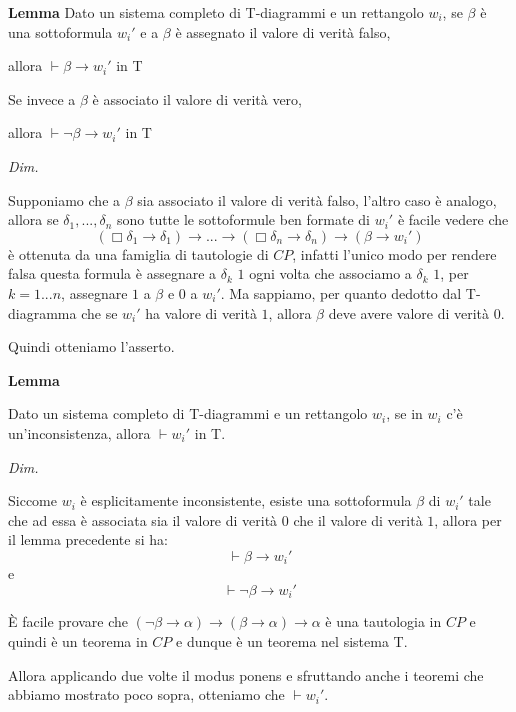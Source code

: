 \documentclass[a4paper, titlepage, 12pt]{report}
\begin{document}
\begin{flushleft}
\textbf{Lemma}
Dato un sistema completo di T-diagrammi e un rettangolo $w_i$,
se $\beta$ è una sottoformula $w_i'$ e a $\beta$ è assegnato il valore di verità falso,

allora $\vdash \beta \rightarrow w_i'$ in T

Se invece a $\beta$ è associato il valore di verità vero,


allora $\vdash \neg \beta \rightarrow w_i'$ in T

\textit{Dim.}

Supponiamo che a $\beta$ sia associato il valore di verità falso, l'altro caso è analogo,
allora se $\delta_1, ..., \delta_n$ sono tutte le sottoformule ben formate di $w_i'$ è
facile vedere che
$$(\Box \delta_1 \rightarrow \delta_1) \rightarrow ... \rightarrow (\Box \delta_n \rightarrow \delta_n) \rightarrow (\beta \rightarrow w_i')$$
è ottenuta da una famiglia di tautologie di $CP$, infatti l'unico modo per rendere
falsa questa formula è assegnare a $\delta_k$ $1$ ogni volta che associamo a $\delta_k$ $1$,
per $k = 1 ... n$, assegnare $1$ a $\beta$ e $0$ a $w_i'$.
Ma sappiamo, per quanto dedotto dal T-diagramma che se $w_i'$ ha valore di verità $1$,
allora $\beta$ deve avere valore di verità $0$.

Quindi otteniamo l'asserto.

\end{flushleft}


\begin{flushleft}
\textbf{Lemma}

Dato un sistema completo di T-diagrammi e un rettangolo $w_i$,
se in $w_i$ c'è un'inconsistenza, allora $\vdash w_i'$ in T.

\textit{Dim.}

Siccome $w_i$ è esplicitamente inconsistente, esiste una sottoformula $\beta$ di $w_i'$
tale che ad essa è associata sia il valore di verità $0$ che il valore di verità $1$,
allora per il lemma precedente si ha:
$$\vdash \beta \rightarrow w_i'$$
e
$$\vdash \neg \beta \rightarrow w_i'$$

È facile provare che
$(\neg \beta \rightarrow \alpha) \rightarrow (\beta \rightarrow \alpha) \rightarrow \alpha$
è una tautologia in $CP$ e quindi è un teorema in $CP$ e dunque è un teorema nel sistema T.

Allora applicando due volte il modus ponens e sfruttando anche i teoremi che abbiamo mostrato poco sopra,
otteniamo che $\vdash w_i'$.

\end{flushleft}
\end{document}
